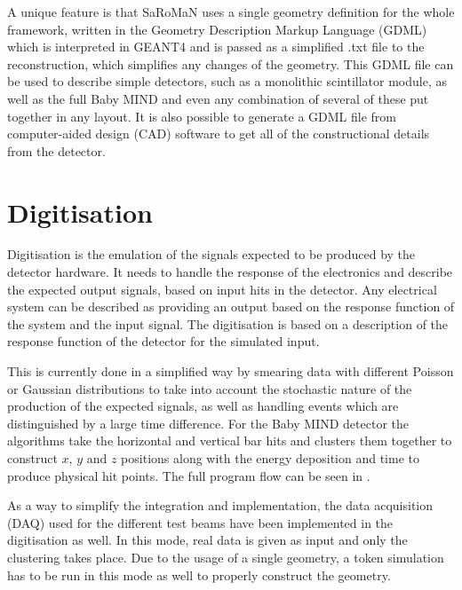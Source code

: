 
A unique feature is that SaRoMaN uses a single geometry definition for the whole framework, written in the Geometry Description Markup Language (GDML)~\cite{GDML} which is interpreted in GEANT4 and is passed as a simplified .txt file to the reconstruction, which simplifies any changes of the geometry. This GDML file can be used to describe simple detectors, such as a monolithic scintillator module, as well as the full Baby MIND and even any combination of several of these put together in any layout. It is also possible to generate a GDML file from computer-aided design (CAD) software to get all of the constructional details from the detector.

\section{Digitisation}
Digitisation is the emulation of the signals expected to be produced by the detector hardware. It needs to handle the response of the electronics and describe the expected output signals, based on input hits in the detector. Any electrical system can be described as providing an output based on the response function of the system and the input signal. The digitisation is based on a description of the response function of the detector for the simulated input.

This is currently done in a simplified way by smearing data with different Poisson or Gaussian distributions to take into account the stochastic nature of the production of the expected signals, as well as handling events which are distinguished by a large time difference. For the Baby MIND detector the algorithms take the horizontal and vertical bar hits and clusters them together to construct $x$, $y$ and $z$ positions along with the energy deposition and time to produce physical hit points. The full program flow can be seen in .

As a way to simplify the integration and implementation, the data acquisition (DAQ) used for the different test beams have been implemented in the digitisation as well. In this mode, real data is given as input and only the clustering takes place. Due to the usage of a single geometry, a token simulation has to be run in this mode as well to properly construct the geometry.

